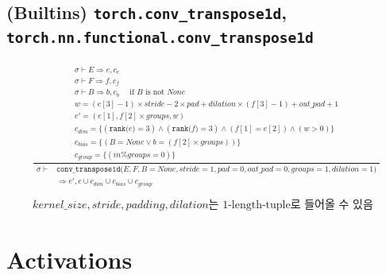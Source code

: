 \documentclass{article}
\newcommand{\x}{\times}
\newcommand{\rem}{\mtt{\%}}
\newcommand{\Rar}{\Rightarrow}
\newcommand{\ttt}[1]{\texttt{#1}}
\newcommand{\mtt}[1]{\mathtt{#1}}
\newcommand{\bigspace}{\,\,\,\,\,\,\,\,}
\newcommand{\op}[2]{\mtt{#1(}#2\mtt{)}}
\begin{document}
\subsection*{(Builtins) \ttt{torch.conv\_transpose1d}, \ttt{torch.nn.functional.conv\_transpose1d}}
\begin{align*}
  \frac
  {
    \begin{array}{l}
      \sigma \vdash E \Rar e, c_e \\
      \sigma \vdash F \Rar f, c_f \\
      \sigma \vdash B \Rar b, c_b \bigspace \text{if $B$ is not $None$} \\
      w = (e[3] - 1) \x stride - 2 \x pad + dilation \x (f[3] - 1) + out\_pad
      + 1\\
      e' = (e[1], f[2] \x groups, w) \\
      c_{dim} = \{ (\op{rank}{e} = 3) \land (\op{rank}{f} = 3) \land (f[1] = e[2])
        \land (w > 0) \} \\
      c_{bias} = \{ (B = None \lor b = (f[2] \x groups) ) \} \\
      c_{group} = \{ (in \rem groups = 0) \}
    \end{array}
  }
  {
    \begin{array}{ll}
      \sigma \vdash & \op{conv\_transpose1d}{E, F, B=None, stride=1, pad=0,
        out\_pad=0, groups=1, dilation=1} \\
      & \Rar e', c \cup c_{dim} \cup c_{bias} \cup c_{group}
    \end{array}
  } \\
  \\
  \text{$kernel\_size, stride, padding, dilation$는 1-length-tuple로 들어올
  수 있음}
\end{align*}%

\section*{Activations}
\end{document}
